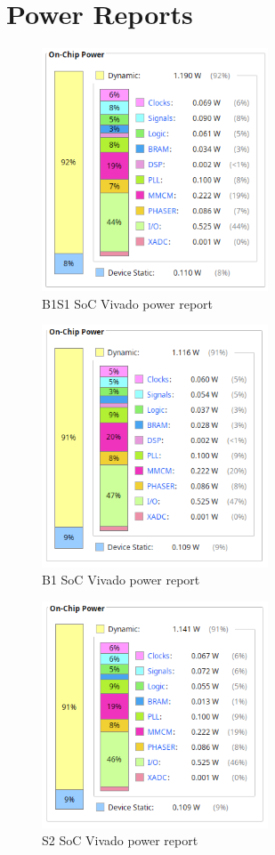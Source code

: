 \section{Power Reports}
\begin{figure}[h!]
    \centering
    \includegraphics[width=0.6\textwidth]{img/b1s1_power_rep.png}
    \caption{B1S1 SoC Vivado power report}
    \label{fig:b1s1_power}
\end{figure}

\begin{figure}[h!]
    \centering
    \includegraphics[width=0.6\textwidth]{img/b1_power.png}
    \caption{B1 SoC Vivado power report}
    \label{fig:b1_power}
\end{figure}

\begin{figure}[h!]
    \centering
    \includegraphics[width=0.6\textwidth]{img/s2_power.png}
    \caption{S2 SoC Vivado power report}
    \label{fig:s2_power}
\end{figure}